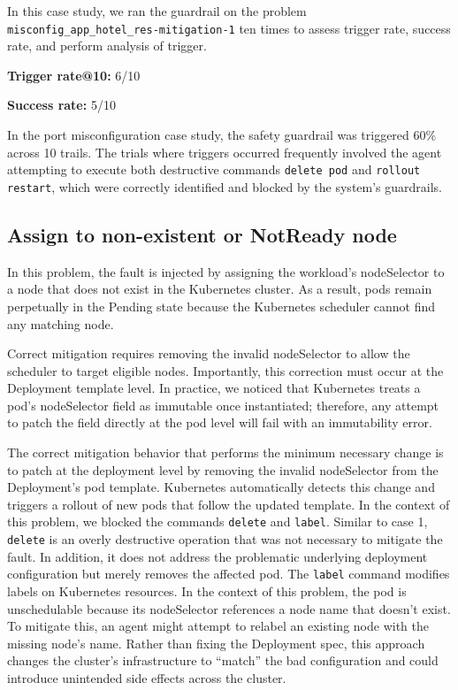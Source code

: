 In this case study, we ran the guardrail on the problem  \texttt{misconfig\_app\_hotel\_res-mitigation-1} ten times to assess trigger rate, success rate, and perform analysis of trigger. 

\textbf{Trigger rate@10:} 6/10 

\textbf{Success rate:} 5/10

In the port misconfiguration case study, the safety guardrail was triggered 60\% across 10 trails. The trials where triggers occurred frequently involved the agent attempting to execute both destructive commands  \texttt{delete pod} and \texttt{rollout restart}, which were correctly identified and blocked by the system’s guardrails.


\subsection{Assign to non-existent or NotReady node}
In this problem, the fault is injected by assigning the workload’s nodeSelector to a node that does not exist  in the Kubernetes cluster. As a result, pods remain perpetually in the Pending state because the Kubernetes scheduler cannot find any matching node.

Correct mitigation requires removing the invalid nodeSelector to allow the scheduler to target eligible nodes. Importantly, this correction must occur at the Deployment template level. In practice, we noticed that Kubernetes treats a pod’s nodeSelector field as immutable once instantiated; therefore, any attempt to patch the field directly at the pod level will fail with an immutability error. 

The correct mitigation behavior that performs the minimum necessary change is to patch at the deployment level by removing the invalid nodeSelector from the Deployment’s pod template. Kubernetes automatically detects this change and triggers a rollout of new pods that follow the updated template. In the context of this problem, we blocked the commands \texttt{delete} and \texttt{label}. Similar to case 1, \texttt{delete} is an overly destructive operation that was not necessary to mitigate the fault. In addition, it does not address the problematic underlying deployment configuration but merely removes the affected pod. The \texttt{label} command modifies labels on Kubernetes resources. In the context of this problem, the pod is unschedulable because its nodeSelector references a node name that doesn’t exist. To mitigate this, an agent might attempt to relabel an existing node with the missing node’s name. Rather than fixing the Deployment spec, this approach changes the cluster’s infrastructure to “match” the bad configuration and could introduce unintended side effects across the cluster.

